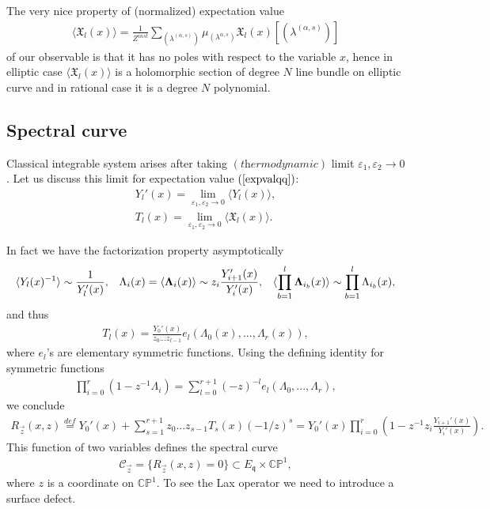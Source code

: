 \documentclass[12pt]{article}
\numberwithin{equation}{section}
\theoremstyle{definition}
\begin{document}
The very nice property of (normalized) expectation value 
\begin{align}\label{expvalqq}
    \langle \mathfrak{X}_{l}(x) \rangle = \frac{1}{Z^{inst}}\sum\limits_{(\lambda^{(\alpha, s)})} \mu_{(\lambda^{\alpha, s})} \mathfrak{X}_{l}(x)[(\lambda^{(\alpha, s)})]
\end{align}
of our observable is that it has no poles with respect to the variable $x$, hence in elliptic case $\langle \mathfrak{X}_{l}(x) \rangle$ is a holomorphic section of degree $N$ line bundle on elliptic curve and in rational case it is a degree $N$ polynomial.
\subsection{Spectral curve}
Classical integrable system arises after taking $(\textit{thermodynamic})$ limit $\varepsilon_1 , \varepsilon_2 \rightarrow 0$. 
Let us discuss this limit for expectation value $(\ref{expvalqq})$:
\begin{align*}
    Y_{l}'(x) = \lim\limits_{\varepsilon_1 , \varepsilon_2 \rightarrow 0} \langle Y_{l}(x) \rangle,\\
    T_{l}(x) = \lim\limits_{\varepsilon_1 , \varepsilon_2 \rightarrow 0}  \langle \mathfrak{X}_{l}(x) \rangle.
\end{align*}

In fact we have the factorization property asymptotically
\begin{align*}
    \langle Y_{l}(x)^{-1} \rangle \sim \frac{1}{ Y_{l}'(x)}, \;\;\; \Lambda_{i}(x) = \langle \bold{\Lambda}_{i}(x) \rangle \sim z_i  \frac{ Y_{i+1}'(x) }{  Y_{i}'(x) } , \;\;\; \langle \prod\limits_{b = 1}^{l}\bold{\Lambda}_{i_{b}}(x) \rangle \sim \prod\limits_{b = 1}^{l}\Lambda_{i_b}(x),
\end{align*}
and thus
\begin{align*}
    T_{l}(x) = \frac{Y_{0}'(x) }{z_0 ... z_{l-1}}e_{l}(\Lambda_{0}(x), ..., \Lambda_{r}(x)),
\end{align*}
where $e_{l}$'s are elementary symmetric functions. Using the defining identity for symmetric functions
\begin{align*}
    \prod\limits_{i = 0}^{r}(1 - z^{-1}\Lambda_{i}) = \sum\limits_{l = 0}^{r + 1}(-z)^{-l}e_{l}(\Lambda_{0}, ..., \Lambda_{r}),
\end{align*}
we conclude
\begin{align*}
   R_{\vec{z}}(x, z) \overset{def}{=} Y_{0}'(x) + \sum\limits_{s = 1}^{r + 1}z_{0}...z_{s-1}T_{s}(x)(-1/z)^{s} = Y_{0}'(x)\prod\limits_{i = 0}^{r}\left( 1 - z^{-1} z_{i}\frac{ Y_{i+1}'(x) }{ Y_{i}'(x)} \right).
\end{align*}
This function of two variables defines the spectral curve
\begin{align*}
    \mathcal{C}_{\vec{z}} = \{R_{\vec{z}}(x, z) = 0\} \subset E_{\mathfrak{q}} \times \mathbb{CP}^{1},
\end{align*}
where $z$ is a coordinate on $\mathbb{CP}^{1}$. To see the Lax operator we need to introduce a surface defect.
\end{document}
